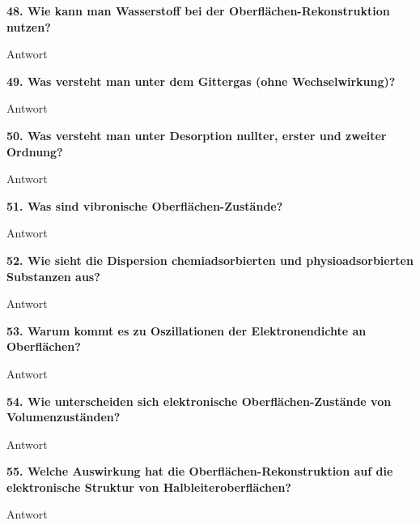 \noindent\textbf{48. Wie kann man Wasserstoff bei der Oberflächen-Rekonstruktion nutzen?}\\
\begin{addmargin}[25pt]{0pt}
Antwort\\
\end{addmargin}

\noindent\textbf{49. Was versteht man unter dem Gittergas (ohne Wechselwirkung)?}\\
\begin{addmargin}[25pt]{0pt}
Antwort\\
\end{addmargin}

\noindent\textbf{50. Was versteht man unter Desorption nullter, erster und zweiter Ordnung?}\\
\begin{addmargin}[25pt]{0pt}
Antwort\\
\end{addmargin}

\noindent\textbf{51. Was sind vibronische Oberflächen-Zustände?}\\
\begin{addmargin}[25pt]{0pt}
Antwort\\
\end{addmargin}

\noindent\textbf{52. Wie sieht die Dispersion chemiadsorbierten und physioadsorbierten Substanzen aus?}\\
\begin{addmargin}[25pt]{0pt}
Antwort\\
\end{addmargin}

\noindent\textbf{53. Warum kommt es zu Oszillationen der Elektronendichte an Oberflächen?}\\
\begin{addmargin}[25pt]{0pt}
Antwort\\
\end{addmargin}

\noindent\textbf{54. Wie unterscheiden sich elektronische Oberflächen-Zustände von Volumenzuständen?}\\
\begin{addmargin}[25pt]{0pt}
Antwort\\
\end{addmargin}

\noindent\textbf{55. Welche Auswirkung hat die Oberflächen-Rekonstruktion auf die elektronische Struktur von Halbleiteroberflächen?}\\
\begin{addmargin}[25pt]{0pt}
Antwort\\
\end{addmargin}

